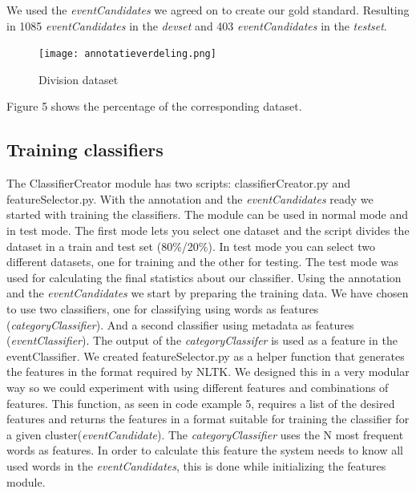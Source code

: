 \documentclass[
10pt, %
a4paper, %
oneside, %
headinclude,footinclude, %
BCOR5mm, %
]{scrartcl}
\begin{document}
\newpage
\noindent We used the \textit{eventCandidates} we agreed on to create our gold standard. Resulting in 1085 \textit{eventCandidates} in the \textit{devset} and 403 \textit{eventCandidates} in the \textit{testset}.

\begin{figure}[htbp] %
   \centering
   \texttt{[image: annotatieverdeling.png]} 
   \caption{Division dataset}
   \label{fig:example}
\end{figure} 
\noindent Figure 5 shows the percentage of the corresponding dataset.

\subsection{Training classifiers}
The ClassifierCreator module has two scripts: classifierCreator.py and featureSelector.py. With the annotation and the \textit{eventCandidates} ready we started with training the classifiers. The module can be used in normal mode and in test mode. The first mode lets you select one dataset and the script divides the dataset in a train and test set (80\%/20\%). In test mode you can select two different datasets, one for training and the other for testing. The test mode was used for calculating the final statistics about our classifier.
\vl
Using the annotation and the \textit{eventCandidates} we start by preparing the training data. We have chosen to use two classifiers, one for classifying using words as features (\textit{categoryClassifier}). And a second classifier using metadata as features (\textit{eventClassifier}). The output of the \textit{categoryClassifer} is used as a feature in the eventClassifier.
\vl
We created featureSelector.py as a helper function that generates the features in the format required by NLTK. We designed this in a very modular way so we could experiment with using different features and combinations of features. 
\vl
This function, as seen in code example 5, requires a list of the desired features and returns the features in a format suitable for training the classifier for a given cluster(\textit{eventCandidate}).\vl
The \textit{categoryClassifier} uses the N most frequent words as features. In order to calculate this feature the system needs to know all used words in the \textit{eventCandidates}, this is done while initializing the features module.
\end{document}
